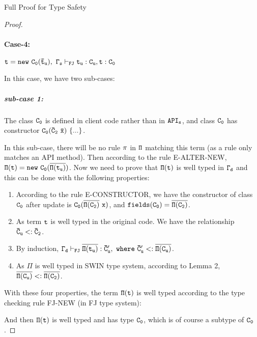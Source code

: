 \begin{section}{Full Proof for Type Safety}
\begin{proof}
\paragraph{Case-4:}
$\tt t=new\ C_0(\bar{t}_u),\ \Gamma_s\vdash_{FJ} t_u:C_u, t:C_0$
\par
In this case, we have two sub-cases:
\subparagraph{sub-case 1:} The class $\tt C_0$ is defined in client code rather than in $\tt API_s$, and class $\tt C_0$ has constructor $\tt  C_0(\bar{C}_2\ \bar{x})\ \{...\}$.
\par In this sub-case, there will be no rule $\tt\pi$ in $\tt \Pi$ matching this term (as a rule only matches an API method). Then according to the rule E-ALTER-NEW, 
$\tt\Pi(t)=new\ C_0(\overline{\Pi(t_u)})$. Now we need to prove that $\tt\Pi(t)$ is well typed in $\tt \Gamma_d$ and this can be done with the following properties:
\begin{enumerate}
\item According to the rule E-CONSTRUCTOR, we have the constructor of class $\tt C_0$ after update is $\tt C_0(\overline{\Pi(C_2)}\ x)$, and $\tt fields(C_0) = \overline{\Pi(C_2)}$.
\item As term $\tt t$ is well typed in the original code. We have the relationship $\tt \bar{C}_u <: \bar{C}_2$.
\item By induction, $\tt \Gamma_d \vdash_{FJ} \overline{\Pi(t_u)}: \bar{C}'_u,\ where\ \bar{C}'_u <: \overline{\Pi(C_u)}$.
\item As $\Pi$ is well typed in SWIN type system, according to Lemma 2, $\tt \overline{\Pi(C_u)} <: \overline{\Pi(C_2)}$.
\end{enumerate}
With these four properties, the term $\tt\Pi(t)$ is well typed according to the type checking rule FJ-NEW (in FJ type system):
\begin{center}
\noLine
{}
\DP
\end{center}
And then $\tt\Pi(t)$ is well typed and has type $\tt C_0$, which is of course a subtype of $\tt C_0$.


\end{proof}
\end{section}
